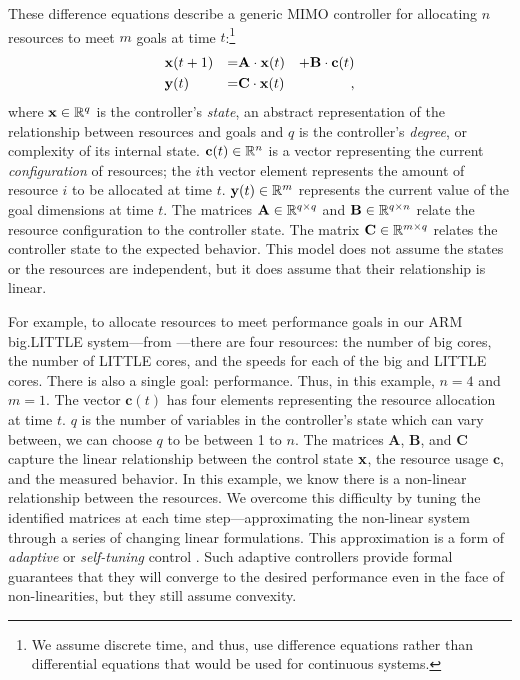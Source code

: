 These difference equations describe a generic MIMO controller for
allocating $n$ resources to meet $m$ goals at time $t$:\footnote{We
  assume discrete time, and thus, use difference equations rather than
  differential equations that would be used for continuous systems.}
\begin{equation}
\begin{aligned}
&\mathbf{x}(t+1) &=& \mathbf{A} \cdot \mathbf{x}(t)& + \mathbf{B} \cdot \mathbf{c}(t)\\
&\mathbf{y}(t)   &=& \mathbf{C} \cdot \mathbf{x}(t)&,
\end{aligned}
\label{eqn:system:mimo}
\end{equation}
where $\mathbf{x} \in \mathbb{R}^{q}$ is the controller's \emph{state}, an abstract
representation of the relationship between resources and goals and $q$
is the controller's \emph{degree}, or complexity of its internal
state.  $\mathbf{c}(t) \in \mathbb{R}^n$ is a vector representing the current
\emph{configuration} of resources; \ie{} the $i$th vector element
represents the amount of resource $i$ to be allocated at time $t$.
$\mathbf{y}(t) \in \mathbb{R}^{m}$ represents the current value of the goal dimensions
at time $t$. The matrices $\mathbf{A} \in \mathbb{R}^{q \times q}$ and
$\mathbf{B} \in \mathbb{R}^{q \times n}$ relate the resource configuration to
the controller state.  The matrix $\mathbf{C} \in \mathbb{R}^{m \times q}$
relates the controller state to the expected behavior.  This model
does not assume the states or the resources are independent, but it
does assume that their relationship is linear.

For example, to allocate resources to meet performance goals in our
ARM big.LITTLE system---from ---there are four
resources: the number of big cores, the number of LITTLE cores, and
the speeds for each of the big and LITTLE cores.  There is also a
single goal: performance.  Thus, in this example, $n=4$ and $m=1$. The
vector $\mathbf{c}(t)$ has four elements representing the resource
allocation at time $t$. $q$ is the number of variables in the
controller's state which can vary between, we can choose $q$ to be
between 1 to $n$.  The matrices $\mathbf{A}$, $\mathbf{B}$, and
$\mathbf{C}$ capture the linear relationship between the control state
$\mathbf{x}$, the resource usage $\mathbf{c}$, and the measured behavior.  In
this example, we know there is a non-linear relationship between the
resources.  We overcome this difficulty by tuning the identified
matrices at each time step---approximating the non-linear system
through a series of changing linear formulations.  This approximation
is a form of \emph{adaptive} or \emph{self-tuning} control
\cite{HandbookControl}.  Such adaptive controllers provide formal
guarantees that they will converge to the desired performance even in
the face of non-linearities, but they still assume convexity.

